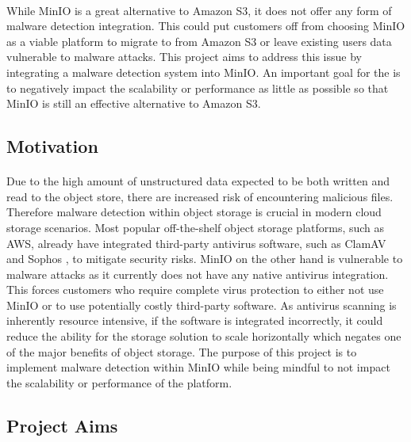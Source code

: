 \documentclass[12pt, conference, final, a4paper, onecolumn, compsoc]{IEEEtran}
\begin{document}
    \paragraph{} %
    While MinIO is a great alternative to Amazon S3, it does not offer any form
    of malware detection integration. This could put customers off from choosing
    MinIO as a viable platform to migrate to from Amazon S3 or leave existing
    users data vulnerable to malware attacks. This project aims to address this
    issue by integrating a malware detection system into MinIO. An important
    goal for the is to negatively impact the scalability or performance as
    little as possible so that MinIO is still an effective alternative to Amazon S3.

    \subsection*{Motivation}
    \paragraph{}
    Due to the high amount of unstructured data expected to be both written and
    read to the object store, there are increased risk of encountering malicious
    files. Therefore malware detection within object storage is crucial in
    modern cloud storage scenarios. Most popular off-the-shelf object storage
    platforms, such as AWS, already have integrated third-party antivirus
    software, such as ClamAV and Sophos \citep{amazon-md}, to mitigate security
    risks. MinIO on the other hand is vulnerable to malware attacks as it
    currently does not have any native antivirus integration. This forces
    customers who require complete virus protection to either not use MinIO or
    to use potentially costly third-party software. As antivirus scanning is
    inherently resource intensive, if the software is integrated incorrectly, it
    could reduce the ability for the storage solution to scale horizontally
    which negates one of the major benefits of object storage. The purpose of
    this project is to implement malware detection within MinIO while being
    mindful to not impact the scalability or performance of the platform.

    \subsection*{Project Aims}
\end{document}
